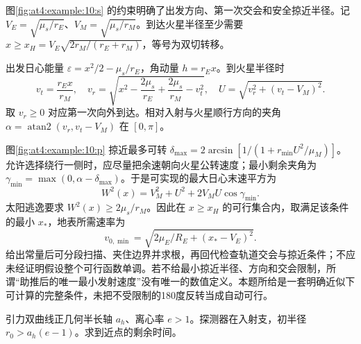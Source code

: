 \begin{solution}
图\ref{fig:at4:example:10:s} 的约束明确了出发方向、第一次交会和安全掠近半径。记 $V_E=\sqrt{\mu_s/r_E}$、$V_M=\sqrt{\mu_s/r_M}$。到达火星半径至少需要 $x\ge x_H=V_E\sqrt{2r_M/(r_E+r_M)}$，等号为双切转移。

出发日心能量 $\varepsilon=x^2/2-\mu_s/r_E$，角动量 $h=r_Ex$。到火星半径时
\[v_t=\frac{r_Ex}{r_M},\quad
v_r=\sqrt{x^2-\frac{2\mu_s}{r_E}+\frac{2\mu_s}{r_M}-v_t^2},\quad
U=\sqrt{v_r^2+(v_t-V_M)^2}.
\]
取 $v_r\ge0$ 对应第一次向外到达。相对入射与火星顺行方向的夹角 $\alpha=\operatorname{atan2}(v_r,v_t-V_M)$ 在 $[0,\pi]$。

图\ref{fig:at4:example:10:p} 掠近最多可转 $\delta_{\max}=2\arcsin[1/(1+r_{\min}U^2/\mu_M)]$。允许选择绕行一侧时，应尽量把余速朝向火星公转速度；最小剩余夹角为 $\gamma_{\min}=\max(0,\alpha-\delta_{\max})$。于是可实现的最大日心末速平方为
\[W^2(x)=V_M^2+U^2+2V_MU\cos\gamma_{\min}.
\]
太阳逃逸要求 $W^2(x)\ge2\mu_s/r_M$。因此在 $x\ge x_H$ 的可行集合内，取满足该条件的最小 $x_*$，地表所需速率为
\[v_{0,\min}=\sqrt{2\mu_E/R_E+(x_*-V_E)^2}.\]
给出常量后可分段扫描、夹住边界并求根，再回代检查轨道交会与掠近条件；不应未经证明假设整个可行函数单调。若不给最小掠近半径、方向和交会限制，所谓“助推后的唯一最小发射速度”没有唯一的数值定义。本题所给是一套明确近似下可计算的完整条件，未把不受限制的180度反转当成自动可行。\end{solution}
\begin{question}\begin{example}[双曲轨道到达近点的时间]\label{at4:example:11}
引力双曲线正几何半长轴 $a_h$、离心率 $e>1$。探测器在入射支，初半径 $r_0>a_h(e-1)$。求到近点的剩余时间。
\end{example}
\end{question}
